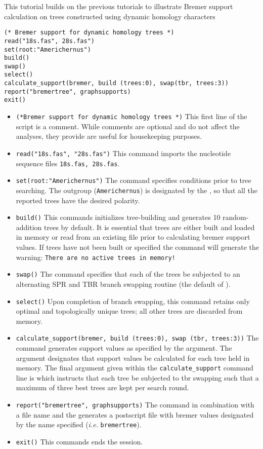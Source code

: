 This tutorial builds on the previous tutorials to illustrate Bremer support 
calculation on trees constructed using dynamic homology characters
    
   \begin{verbatim}
(* Bremer support for dynamic homology trees *)
read("18s.fas", 28s.fas")
set(root:"Americhernus")
build()
swap()
select()
calculate_support(bremer, build (trees:0), swap(tbr, trees:3))
report("bremertree", graphsupports)
exit()
\end{verbatim}

\begin{itemize}
\item \texttt{(*Bremer support for dynamic homology trees *)} This first line of the script is a comment. While comments are optional and do not affect the analyses, they provide are useful for housekeeping purposes.
\item \texttt{read("18s.fas", "28s.fas")} This command imports the nucleotide sequence files \texttt{18s.fas, 28s.fas}.
\item \texttt{set(root:"Americhernus")} The  command specifies conditions prior to tree searching. The outgroup (\texttt{Americhernus}) is designated by the , so that all the reported trees have the desired polarity.     
\item \texttt{build()} This commands initializes tree-building and generates 10 random-addition trees by default.  It is essential that trees are either built and loaded in memory or read from an existing file prior to calculating bremer support values.  If trees have not been built or specified the  command will generate the warning: \texttt{There are no active trees in memory!} 
\item \texttt{swap()} The  command specifies that each of the trees be subjected to an alternating SPR and TBR branch swapping routine (the default of \poy).
\item \texttt{select()} Upon completion of branch swapping, this command retains only optimal and topologically unique trees; all other trees are discarded from memory. 
\item \texttt{calculate\_support(bremer, build (trees:0), swap (tbr, trees:3))} The  command generates support values as specified by the  argument. The  argument designates that support values be calculated for each tree held in memory. The final argument given within the \texttt{calculate\_support} command line is  which instructs that each tree be subjected to tbr swapping such that a maximum of three best trees are kept per search round. 
\item \texttt{report("bremertree", graphsupports)}  The  command in combination with a file name and the  generates a postscript file with bremer values designated by the name specified (\emph{i.e.} \texttt{bremertree}). 
\item \texttt{exit()} This commands ends the \poy session.
\end{itemize}

